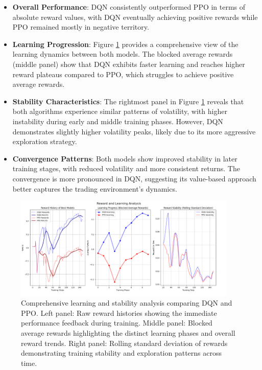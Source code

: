 \documentclass[11pt]{article}
\begin{document}
\begin{itemize}
  \item \textbf{Overall Performance}: DQN consistently outperformed PPO in terms of absolute reward values, with DQN eventually achieving positive rewards while PPO remained mostly in negative territory.
  
  \item \textbf{Learning Progression}: Figure \ref{fig:learning_analysis} provides a comprehensive view of the learning dynamics between both models. The blocked average rewards (middle panel) show that DQN exhibits faster learning and reaches higher reward plateaus compared to PPO, which struggles to achieve positive average rewards.
  
  \item \textbf{Stability Characteristics}: The rightmost panel in Figure \ref{fig:learning_analysis} reveals that both algorithms experience similar patterns of volatility, with higher instability during early and middle training phases. However, DQN demonstrates slightly higher volatility peaks, likely due to its more aggressive exploration strategy.

  \item \textbf{Convergence Patterns}: Both models show improved stability in later training stages, with reduced volatility and more consistent returns. The convergence is more pronounced in DQN, suggesting its value-based approach better captures the trading environment's dynamics.
\end{itemize}

\begin{figure}[h]
  \centering
  \includegraphics[width=0.95\textwidth]{fig/Reward and Learning Analysis.png}
  \caption{Comprehensive learning and stability analysis comparing DQN and PPO. Left panel: Raw reward histories showing the immediate performance feedback during training. Middle panel: Blocked average rewards highlighting the distinct learning phases and overall reward trends. Right panel: Rolling standard deviation of rewards demonstrating training stability and exploration patterns across time.}
  \label{fig:learning_analysis}
\end{figure}
\end{document}
